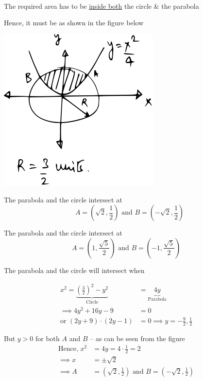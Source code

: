 \documentclass[14pt,fleqn]{extarticle}
\newcommand\xsq{\left(\frac{3}{2} \right)^2 - y^2}
\begin{document}
The required area has to be \underline{inside both}  the circle \& the parabola\newline 

Hence, it must be as shown in the figure below 

\begin{center}
\includegraphics[scale=1.3]{circ.svg} 
\end{center} 

\newcard 

The parabola and the circle intersect at 
\[ \quad  A =\left(\sqrt{2},\frac{1}{2} \right) \text{ and }B = \left( -\sqrt{2},\frac{1}{2}\right) \]

\newcard 

The parabola and the circle intersect at 
\[ A = \left( 1,\frac{\sqrt{5}}{2} \right) \text{ and } B = \left(-1,\frac{\sqrt{5}}{2} \right)  \]

\newcard 

The parabola and the circle will intersect when 

\begin{align}
x^2 = \underbrace{\xsq}_{\text{Circle}} &= \underbrace{4y}_{\text{Parabola}} \\
\implies 4y^2 + 16y - 9 &= 0 \\
\text{or }(2y+9)\cdot (2y-1) &= 0\implies y=-\frac{9}{2},\frac{1}{2}
\end{align}

But \underline{$y > 0$} for both $A$ and $B$ -- as can be seen from the figure 
%
\begin{align}
\text{Hence, }x^2 &= 4y = 4\cdot\frac{1}{2} = 2 \\
\implies x &= \pm\sqrt{2} \\
\implies A &=\left(\sqrt{2},\frac{1}{2} \right) \text{ and }B = \left( -\sqrt{2},\frac{1}{2}\right)
\end{align}
\end{document}
